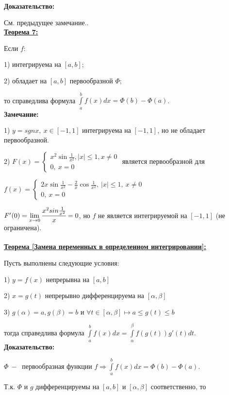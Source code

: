 \documentclass[a4paper,12pt]{article} %
\renewcommand {\leq}{\leqslant}
\begin{document}
\textbf{Доказательство:}

См. предыдущее замечание..\\

\underline{\textbf{Теорема 7:}}

Если $f$:

1) интегрируема на $[a,b]$;

2) обладает на $[a,b]$ первообразной $\Phi $;

то справедлива формула $\int\limits_a^{b} f(x)dx = \Phi(b)-  \Phi(a) $.\\

\textbf{Замечание:}

1) $y = sgn x, ~x \in [-1,1]$ интегрируема на $[-1,1]$, но не обладает первообразной.

2) $F(x)= \begin {cases} x^2 \sin \frac{1}{x^2}, |x|\leq 1, x \neq 0\\ 0, ~x = 0
\end{cases}$ является первообразной для

$f(x) = \begin{cases} 2x \sin\frac{1}{x^2} - \frac{2}{x} \cos\frac{1}{x^2}, ~|x|\leq 1, ~x \neq 0\\ 0, ~x =0
\end{cases}$

$F'(0) =  \lim\limits_{x\rightarrow 0}\cfrac{x^2 sin\frac{1}{x^2}}{x} = 0$, но $f$ не является интегрируемой на $[-1,1]$  (не ограничена).\\\\

\underline{\textbf{Теорема [Замена переменных в определенном интегрировании]:}}

Пусть выполнены следующие условия:

1) $y = f(x)$ непрерывна на $[a,b]$

2) $x = g(t)$ непрерывно дифференцируема на $[\alpha,\beta]$

3) $g(\alpha) = a, g(\beta) = b$ и $\forall t \in [\alpha, \beta] \longmapsto a \leq g(t)\leq b $

тогда справедлива формула $\int\limits_a^b f(x) dx = \int \limits_\alpha^\beta f(g(t))g'(t) dt$.\\

\textbf{Доказательство:}

$\Phi ~-~$ первообразная функции $f\Rightarrow \int\limits_a^b f(x)dx = \Phi(b)- \Phi(a)$.

Т.к. $\Phi$ и $g$ дифференцируемы на $[a,b]$ и $[\alpha, \beta]$ соответственно, то
\end{document}

